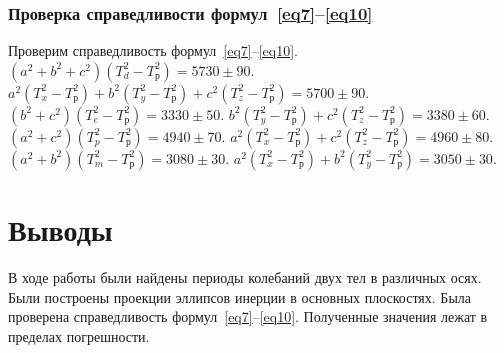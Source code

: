 \documentclass[a4paper,11pt]{article}
\begin{document}
\subsubsection{Проверка справедливости формул~\ref{eq7}--\ref{eq10}}
Проверим справедливость формул~\ref{eq7}--\ref{eq10}.\newline
$(a^{2} + b^{2} + c^{2}) (T_{d}^{2} - T_{р}^{2}) = 5730 \pm 90$.\newline\newline
$a^{2}(T_{x}^{2} - T_{р}^{2}) + b^{2}(T_{y}^{2} - T_{р}^{2}) + c^{2}(T_{z}^{2} - T_{р}^{2}) = 5700 \pm 90$.\newline\newline
$(b^{2} + c^{2}) (T_{e}^{2} - T_{р}^{2}) = 3330 \pm 50$.\newline\newline
$b^{2}(T_{y}^{2} - T_{р}^{2}) + c^{2}(T_{z}^{2} - T_{р}^{2}) = 3380 \pm 60$.\newline\newline
$(a^{2} + c^{2}) (T_{p}^{2} - T_{р}^{2}) = 4940 \pm 70$.\newline\newline
$a^{2}(T_{x}^{2} - T_{р}^{2}) + c^{2}(T_{z}^{2} - T_{р}^{2}) = 4960 \pm 80$.\newline\newline
$(a^{2} + b^{2}) (T_{m}^{2} - T_{р}^{2}) = 3080 \pm 30$.\newline\newline
$a^{2}(T_{x}^{2} - T_{р}^{2}) + b^{2}(T_{y}^{2} - T_{р}^{2}) = 3050 \pm 30$.\newline\newline
\section{Выводы}
В ходе работы были найдены периоды колебаний двух тел в различных осях. Были построены проекции эллипсов инерции в основных плоскостях. Была проверена справедливость формул~\ref{eq7}--\ref{eq10}. Полученные значения лежат в пределах погрешности.
\end{document}
